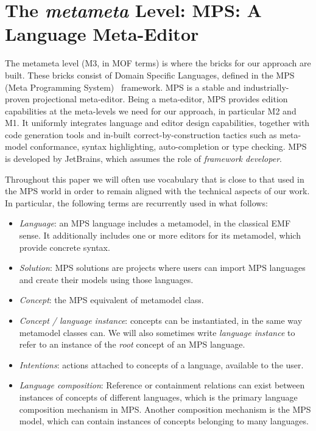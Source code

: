 \section{The \emph{metameta} Level: MPS: A Language Meta-Editor}
\label{sec:metameta}
\vspace{-.2cm}
The metameta level (M3, in MOF terms) is where the bricks for our approach are
built. These bricks consist of Domain Specific Languages, defined in the MPS
(Meta Programming System)~\cite{mps} framework. MPS is a stable and
industrially-proven projectional meta-editor. Being a meta-editor, MPS provides edition
capabilities at the meta-levels we need for our approach, in particular M2 and
M1. It uniformly integrates language and editor design capabilities, together
with code generation tools and in-built correct-by-construction tactics such as meta-model
conformance, syntax highlighting, auto-completion or type checking.  
MPS is developed by JetBrains, which assumes the role of \emph{framework
developer}. 

Throughout this paper we will often use vocabulary that is close to that used in
the MPS world in order to remain aligned with the technical aspects of our
work. In particular, the following terms are recurrently used in what follows:
\vspace{-.1cm}
\begin{itemize}
  \item \emph{Language}: an MPS language includes a metamodel, in the classical
  EMF sense. It additionally includes one or more editors for its metamodel,
  which provide concrete syntax.
  \item \emph{Solution}: MPS solutions are projects where users can import
  MPS languages and create their models using those languages.
  \item \emph{Concept}: the MPS equivalent of metamodel class.
  \item \emph{Concept / language instance}: concepts can be instantiated, in
  the same way metamodel classes can. We will also sometimes write
  \emph{language instance} to refer to an instance of the \emph{root} concept of
  an MPS language.
  \item \emph{Intentions}: actions attached to
  concepts of a language, available to the user. 
  \item \emph{Language composition}:  Reference or containment relations can exist between instances of
  concepts of different languages, which is the primary language composition
  mechanism in MPS.
 Another composition mechanism is the MPS model, which can contain instances of
 concepts belonging to many languages.
\end{itemize}
\vspace{-.5cm}
